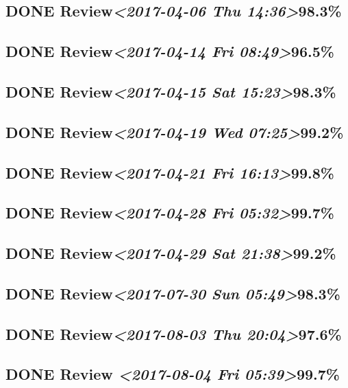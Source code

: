 \documentclass[11pt]{ctexart}
\begin{document}
\subsection{{\bfseries\sffamily DONE} Review\textit{<2017-04-06 Thu 14:36>}98.3\%}
\label{sec:orgdcb0878}
\subsection{{\bfseries\sffamily DONE} Review\textit{<2017-04-14 Fri 08:49>}96.5\%}
\label{sec:orgbd3b14f}
\subsection{{\bfseries\sffamily DONE} Review\textit{<2017-04-15 Sat 15:23>}98.3\%}
\label{sec:org3029ebe}
\subsection{{\bfseries\sffamily DONE} Review\textit{<2017-04-19 Wed 07:25>}99.2\%}
\label{sec:org83444be}
\subsection{{\bfseries\sffamily DONE} Review\textit{<2017-04-21 Fri 16:13>}99.8\%}
\label{sec:org6fca113}
\subsection{{\bfseries\sffamily DONE} Review\textit{<2017-04-28 Fri 05:32>}99.7\%}
\label{sec:org084213f}
\subsection{{\bfseries\sffamily DONE} Review\textit{<2017-04-29 Sat 21:38>}99.2\%}
\label{sec:org6aae902}
\subsection{{\bfseries\sffamily DONE} Review\textit{<2017-07-30 Sun 05:49>}98.3\%}
\label{sec:org4829392}
\subsection{{\bfseries\sffamily DONE} Review\textit{<2017-08-03 Thu 20:04>}97.6\%}
\label{sec:org8e02dc0}
\subsection{{\bfseries\sffamily DONE} Review \textit{<2017-08-04 Fri 05:39>}99.7\%}
\label{sec:org0e7abb2}
\end{document}
